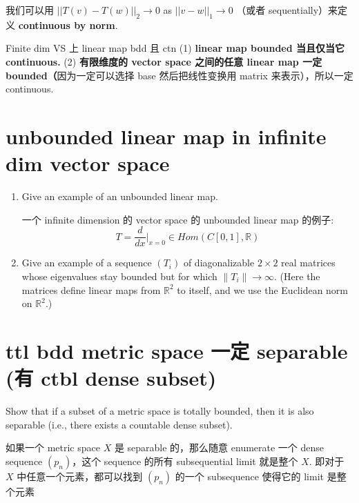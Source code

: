 \documentclass[lang=cn,11pt]{template}
\begin{document}
\begin{remark}
  我们可以用 $||T(v) - T(w)||_2 \rightarrow 0$ as $||v - w||_1 \rightarrow 0$ （或者 sequentially）来定义 \textbf{continuous by norm}.  
\end{remark}

\begin{theorem}{Finite dim VS 上 linear map bdd 且 ctn}\label{Finite dim VS 上 linear map bdd 且 ctn}
    (1) \textbf{linear map bounded 当且仅当它 continuous.}
    (2)  \textbf{有限维度的 vector space 之间的任意 linear map 一定 bounded（}因为一定可以选择 base 然后把线性变换用 matrix 来表示），所以一定 continuous.
\end{theorem}




\section{unbounded linear map in infinite dim vector space}
\begin{enumerate}
    \item Give an example of an unbounded linear map.
    \begin{solution}
        一个 infinite dimension 的 vector space 的 unbounded linear map 的例子: $$T = \frac{d}{dx}|_{x=0} \in Hom(C[0,1], \mathbb{R})$$
    \end{solution}
    \item Give an example of a sequence \( (T_i) \) of diagonalizable \( 2 \times 2 \) real matrices whose eigenvalues stay bounded but for which \( \|T_i\| \to \infty \). (Here the matrices define linear maps from \( \mathbb{R}^2 \) to itself, and we use the Euclidean norm on \( \mathbb{R}^2 \).)
\end{enumerate}

\section{ttl bdd metric space 一定 separable (有 ctbl dense subset)}
Show that if a subset of a metric space is totally bounded, then it is also separable (i.e., there exists a countable dense subset).

\begin{remark}
    如果一个 metric space $X$ 是 separable 的，那么随意 enumerate 一个 dense sequence $(p_n)$，这个 sequence 的所有 subsequential limit 就是整个 $X$. 即对于 $X$ 中任意一个元素，都可以找到 $(p_n)$ 的一个 subsequence 使得它的 limit 是整个元素
\end{remark}
\end{document}
